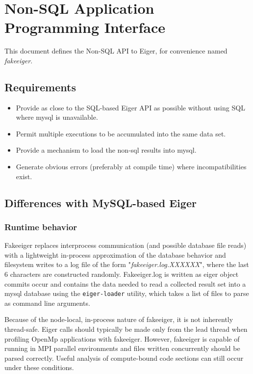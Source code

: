 \section{Non-SQL Application Programming Interface}
\label{sec:fakeapi}
This document defines the Non-SQL API to Eiger, for convenience named {\em fakeeiger}.

\subsection{Requirements}

\begin{itemize}
\item Provide as close to the SQL-based Eiger API as possible without using SQL where mysql is unavailable.

\item Permit multiple executions to be accumulated into the same data set.

\item Provide a mechanism to load the non-sql results into mysql.
 
\item Generate obvious errors (preferably at compile time) where incompatibilities exist.

\end{itemize}

\subsection{Differences with MySQL-based Eiger}

\subsubsection {Runtime behavior} 
Fakeeiger replaces interprocess communication (and possible database file reads)  with a lightweight in-process approximation of the database behavior and filesystem writes to a log file of the form "{\em fakeeiger.log.XXXXXX}", where the last 6 characters are constructed randomly. Fakeeiger.log is written as eiger object commits occur and contains the data needed to read a collected result set into a mysql database using the \texttt{eiger-loader} utility, which takes a list of files to parse as command line arguments.  

Because of the node-local, in-process nature of fakeeiger, it is not inherently thread-safe. Eiger calls should typically be made only from the lead thread when profiling OpenMp applications with fakeeiger. However, fakeeiger is capable of running in MPI parallel environments and files written concurrently should be parsed correctly. Useful analysis of compute-bound code sections can still occur under these conditions.

